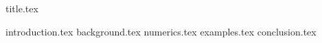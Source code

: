 \documentclass[12pt,a4paper,twoside]{article}
\begin{document}
{title.tex}

\newpage
\tableofcontents
\newpage

\pagestyle{headings}
\raggedbottom

\FloatBarrier

{introduction.tex}
{background.tex}
{numerics.tex}
{examples.tex}
{conclusion.tex}

\nocite{*}
\printbibliography[heading=bibintoc,title=References]

\newpage
{}
\end{document}
